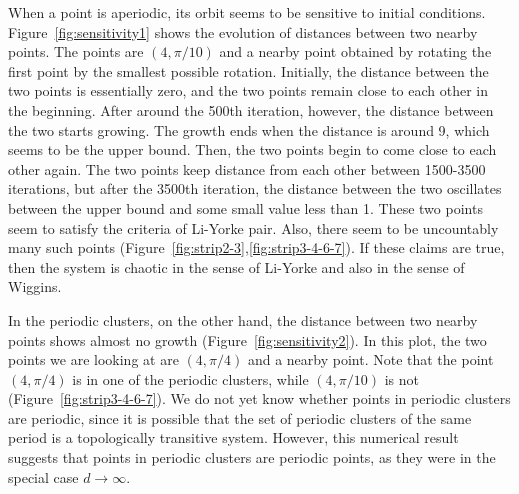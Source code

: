 \documentclass[12pt,twoside]{book}
\begin{document}
When a point is aperiodic, its orbit seems to be sensitive to initial conditions.
Figure~\ref{fig:sensitivity1} shows the evolution of distances between two nearby points.
The points are $(4,\pi/10)$ and a nearby point obtained by rotating the first point by the smallest possible rotation.
Initially, the distance between the two points is essentially zero, and the two points remain close to each other in the beginning.
After around the 500th iteration, however, the distance between the two starts growing.
The growth ends when the distance is around 9, which seems to be the upper bound.
Then, the two points begin to come close to each other again.
The two points keep distance from each other between 1500-3500 iterations, but after the 3500th iteration, the distance between the two oscillates between the upper bound and some small value less than 1.
These two points seem to satisfy the criteria of Li-Yorke pair.
Also, there seem to be uncountably many such points (Figure~\ref{fig:strip2-3},\ref{fig:strip3-4-6-7}).
If these claims are true, then the system is chaotic in the sense of Li-Yorke and also in the sense of Wiggins.

In the periodic clusters, on the other hand, the distance between two nearby points shows almost no growth (Figure~\ref{fig:sensitivity2}).
In this plot, the two points we are looking at are $(4,\pi/4)$ and a nearby point.
Note that the point $(4,\pi/4)$ is in one of the periodic clusters, while $(4,\pi/10)$ is not (Figure~\ref{fig:strip3-4-6-7}).
We do not yet know whether points in periodic clusters are periodic, since it is possible that the set of periodic clusters of the same period is a topologically transitive system.
However, this numerical result suggests that points in periodic clusters are periodic points, as they were in the special case $d \to \infty$.
\end{document}
